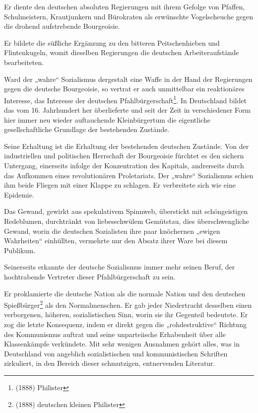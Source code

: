 \documentclass[letterpaper]{article}
\begin{document}
Er diente den deutschen absoluten Regierungen mit ihrem Gefolge von Pfaffen, Schulmeistern, Krautjunkern und Bürokraten als erwünschte Vogelscheuche gegen die drohend aufstrebende Bourgeoisie.

Er bildete die süßliche Ergänzung zu den bitteren Peitschenhieben und Flintenkugeln, womit dieselben Regierungen die deutschen Arbeiteraufstände bearbeiteten.

Ward der „wahre“ Sozialismus dergestalt eine Waffe in der Hand der Regierungen gegen die deutsche Bourgeoisie, so vertrat er auch unmittelbar ein reaktionäres Interesse, das Interesse der deutschen Pfahlbürgerschaft\footnote{(1888) Philister}. In Deutschland bildet das vom 16. Jahrhundert her überlieferte und seit der Zeit in verschiedener Form hier immer neu wieder auftauchende Kleinbürgertum die eigentliche gesellschaftliche Grundlage der bestehenden Zustände.

Seine Erhaltung ist die Erhaltung der bestehenden deutschen Zustände. Von der industriellen und politischen Herrschaft der Bourgeoisie fürchtet es den sichern Untergang, einerseits infolge der Konzentration des Kapitals, andrerseits durch das Aufkommen eines revolutionären Proletariats. Der „wahre“ Sozialismus schien ihm beide Fliegen mit einer Klappe zu schlagen. Er verbreitete sich wie eine Epidemie.

Das Gewand, gewirkt aus spekulativem Spinnweb, überstickt mit schöngeistigen Redeblumen, durchtränkt von liebesschwülem Gemütstau, dies überschwengliche Gewand, worin die deutschen Sozialisten ihre paar knöchernen „ewigen Wahrheiten“ einhüllten, vermehrte nur den Absatz ihrer Ware bei diesem Publikum.

Seinerseits erkannte der deutsche Sozialismus immer mehr seinen Beruf, der hochtrabende Vertreter dieser Pfahlbürgerschaft zu sein. 

Er proklamierte die deutsche Nation als die normale Nation und den deutschen Spießbürger\footnote{(1888) deutschen kleinen Philister} als den Normalmenschen. Er gab jeder Niedertracht desselben einen verborgenen, höheren, sozialistischen Sinn, worin sie ihr Gegenteil bedeutete. Er zog die letzte Konsequenz, indem er direkt gegen die „rohdestruktive“ Richtung des Kommunismus auftrat und seine unparteiische Erhabenheit über alle Klassenkämpfe verkündete. Mit sehr wenigen Ausnahmen gehört alles, was in Deutschland von angeblich sozialistischen und kommunistischen Schriften zirkuliert, in den Bereich dieser schmutzigen, entnervenden Literatur.
\end{document}

